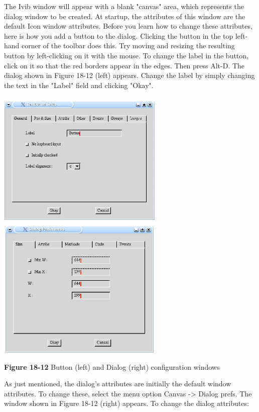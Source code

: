 The Ivib window will appear with a blank
"canvas" area, which represents the dialog
window to be created. At startup, the attributes of this window are the
default Icon window attributes. Before you learn how to change these
attributes, here is how you add a button to the dialog. Clicking the
button in the top left-hand corner of the toolbar does this. Try moving
and resizing the resulting button by left-clicking on it with the
mouse. To change the label in the button, click on it so that the red
borders appear in the edges. Then press Alt-D. The dialog shown in
Figure 18-12 (left) appears.
Change the label by simply changing the text in the
"Label" field and clicking "Okay".

\bigskip

\noindent \includegraphics[width=3.125in,height=2.62in]{ub-img/ub-img61.jpg}
\includegraphics[width=3.125in,height=2.62in]{ub-img/ub-img63.jpg}

{\sffamily\bfseries Figure 18-12}
{\sffamily Button (left) and Dialog (right) configuration windows}

\bigskip

As just mentioned, the dialog's attributes are
initially the default window attributes. To change these, select the
menu option Canvas -{\textgreater} Dialog prefs. The window shown in
Figure 18-12 (right) appears. To change the dialog attributes:

